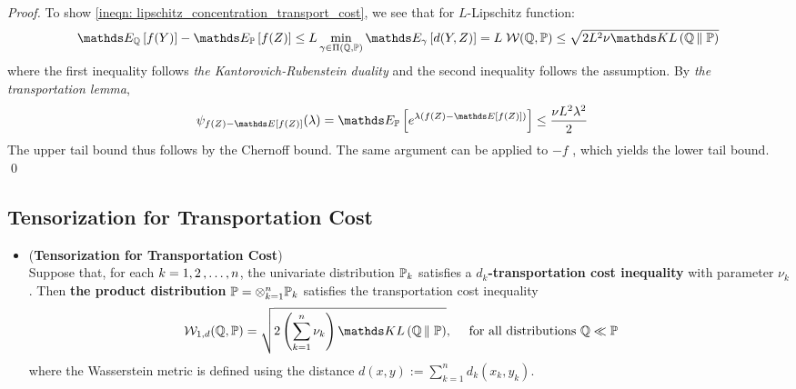 \documentclass[11pt]{article}
\begin{document}
\begin{itemize}
\begin{proof}
To show \eqref{ineqn: lipschitz_concentration_transport_cost}, we see that for $L$-Lipschitz function:
\begin{align*}
\E{\bQ}{f(Y)} - \E{\bP}{f(Z)} \le L\min_{\gamma \in \Pi (\bQ, \bP)} \E{\gamma}{d(Y, Z)} = L \;\cW(\bQ, \bP) \le \sqrt{2 L^2 \nu \kl{\bQ}{\bP}}
\end{align*} where the first inequality follows \emph{the Kantorovich-Rubenstein duality} and the second inequality follows the assumption. By \emph{the transportation lemma}, 
\begin{align*}
\psi_{f(Z) - \E{}{f(Z)}}(\lambda) = \E{\bP}{e^{\lambda \paren{f(Z) - \E{}{f(Z)}}}} &\le \frac{\nu L^2 \lambda^2}{2}
\end{align*} The upper tail bound thus follows by the Chernoff bound. The same argument can be applied to  $-f$ , which yields the lower tail bound. \qed
\end{proof}

\end{itemize}
\subsection{Tensorization for Transportation Cost}
\begin{itemize}
\item \begin{proposition} (\textbf{Tensorization for Transportation Cost}) \citep{boucheron2013concentration}\\
Suppose that, for each $k = 1, 2 \,{,}\ldots{,}\, n$, the univariate distribution ${\mathbb P}_k$ satisfies a \textbf{$d_k$-transportation cost inequality} with parameter $\nu_k$. Then \textbf{the product distribution} ${\mathbb P} = \otimes_{k=1}^n {\mathbb P}_k$ satisfies the transportation cost inequality
\begin{align}
\cW_{1, d}(\bQ, \bP) &= \sqrt{2\paren{\sum_{k=1}^n \nu_k} \kl{\bQ}{\bP}}, \quad \text{ for all distributions $\bQ \ll \bP$ } \label{ineqn: tensorization_transport_cost}
\end{align}  where the Wasserstein metric is defined using the distance $d(x, y) :=  \sum_{k=1}^{n}d_k(x_k, y_k)$.
\end{proposition}
\end{itemize}
\end{document}
